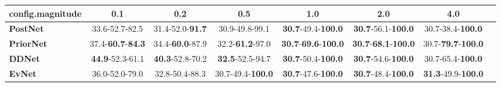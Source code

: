 \begin{tabular}{lccccccc}
\toprule
\textbf{config.magnitude} &                               0.1 &                      0.2 &                       0.5 &                                         1.0 &                                         2.0 &                                4.0 \\
\midrule
\textbf{PostNet } &                    33.6-52.7-82.5 &  31.4-52.0-\textbf{91.7} &            30.9-49.8-99.1 &           \textbf{30.7}-49.4-\textbf{100.0} &           \textbf{30.7}-56.1-\textbf{100.0} &           30.7-38.4-\textbf{100.0} \\
\textbf{PriorNet} &  37.4-\textbf{60.7}-\textbf{84.3} &  34.4-\textbf{60.0}-87.9 &   32.2-\textbf{61.2}-97.0 &  \textbf{30.7}-\textbf{69.6}-\textbf{100.0} &  \textbf{30.7}-\textbf{68.1}-\textbf{100.0} &  30.7-\textbf{79.7}-\textbf{100.0} \\
\textbf{DDNet   } &           \textbf{44.9}-52.3-61.1 &  \textbf{40.3}-52.8-70.2 &   \textbf{32.5}-52.5-94.7 &           \textbf{30.7}-50.4-\textbf{100.0} &           \textbf{30.7}-54.6-\textbf{100.0} &           30.7-65.4-\textbf{100.0} \\
\textbf{EvNet   } &                    36.0-52.0-79.0 &           32.8-50.4-88.3 &  30.7-49.4-\textbf{100.0} &           \textbf{30.7}-47.6-\textbf{100.0} &           \textbf{30.7}-48.4-\textbf{100.0} &  \textbf{31.3}-49.9-\textbf{100.0} \\
\bottomrule
\end{tabular}

